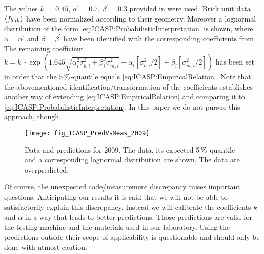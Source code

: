 The values \(k^\prime = 0.45\), \(\alpha^\prime = 0.7\), \(\beta^\prime = 0.3\) provided in \cite{Standard:Eurocode6:1-1} were used.
Brick unit data \(\langle{f_{b,ik}}\rangle\) have been normalized according to their geometry.
Moreover a lognormal distribution of the form \cref{eq:ICASP:ProbabilisticInterpretation} is shown,
where \(\alpha=\alpha^\prime\) and \(\beta=\beta^\prime\) have been identified with the corresponding coefficients from \cite{Standard:Eurocode6:1-1}.
The remaining coefficient \(k = k^\prime \cdot \exp (1.645 \sqrt{\alpha_i^2 \sigma_{b,i}^2 + \beta_i^2 \sigma_{m,i}^2} + \alpha_i [\sigma_{b,i}^2 / 2] + \beta_i [\sigma_{m,i}^2 / 2])\)
has been set in order that the \(\unit[5]{\%}\)-quantile equals \cref{eq:ICASP:EmpiricalRelation}.
Note that the abovementioned identification/transformation of the coefficients establishes another way of extending \cref{eq:ICASP:EmpiricalRelation} and comparing it to \cref{eq:ICASP:ProbabilisticInterpretation}.
In this paper we do not pursue this approach, though.
\begin{figure}[ht]
  \centering
  \texttt{[image: fig\_ICASP\_PredVsMeas\_2009]}
  \caption[Data and predictions for 2009]{Data and predictions for 2009.
           The data, its expected \(\unit[5]{\%}\)-quantile and a corresponding lognormal distribution are shown.
           The data are overpredicted.
          }
  \label{fig:ICASP:MeasVsPred:2009}
\end{figure}
\par %
Of course, the unexpected code/measurement discrepancy raises important questions.
Anticipating our results it is said that we will not be able to satisfactorily explain this discrepancy.
Instead we will calibrate the coefficients \(k\) and \(\alpha\) in a way that leads to better predictions.
Those predictions are valid for the testing machine and the materials used in our laboratory.
Using the predictions outside their scope of applicability is questionable and should only be done with utmost caution.